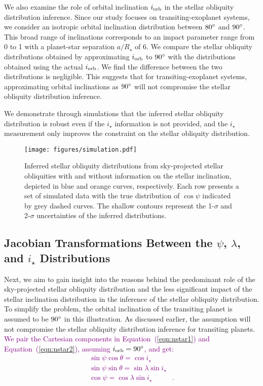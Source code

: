 \documentclass[twocolumn,times]{aastex631}
\newcommand{\edits}[1]{\textcolor{purple}{#1}}
\begin{document}
We also examine the role of orbital inclination $i_{\rm orb}$ in the stellar obliquity distribution inference. Since our study focuses on transiting-exoplanet systems, we consider an isotropic orbital inclination distribution between $80\mbox{$^\circ$}$ and $90\mbox{$^\circ$}$. This broad range of inclinations corresponds to an impact parameter range from 0 to 1 with a planet-star separation $a/R_\star$ of 6.
We compare the stellar obliquity distributions obtained by approximating $i_{\rm orb}$ to $90\mbox{$^\circ$}$ with the distributions obtained using the actual $i_{\rm orb}$. We find the difference between the two distributions is negligible. This suggests that for transiting-exoplanet systems, approximating orbital inclinations as $90\mbox{$^\circ$}$ will not compromise the stellar obliquity distribution inference.

We demonstrate through simulations that the inferred stellar obliquity distribution is robust even if the $i_\star$ information is not provided, and the $i_\star$ measurement only improves the constraint on the stellar obliquity distribution.

\begin{figure}[ht!]
    \centering
    \texttt{[image: figures/simulation.pdf]}
    \caption{Inferred stellar obliquity distributions from sky-projected stellar obliquities with and without information on the stellar inclination, depicted in blue and orange curves, respectively. Each row presents a set of simulated data with the true distribution of $\cos{\psi}$ indicated by grey dashed curves. The shallow contours represent the 1-$\sigma$ and 2-$\sigma$ uncertainties of the inferred distributions.}
    \label{fig:simulation}
\end{figure}

\subsection{Jacobian Transformations Between the $\psi$, $\lambda$, and \lowercase{$i_\star$} Distributions}\label{subsec:jacobian}

Next, we aim to gain insight into the reasons behind the predominant role of the sky-projected stellar obliquity distribution and the less significant impact of the stellar inclination distribution in the inference of the stellar obliquity distribution. To simplify the problem, the orbital inclination of the transiting planet is assumed to be $90\mbox{$^\circ$}$ in this illustration. As discussed earlier, the assumption will not compromise the stellar obliquity distribution inference for transiting planets.
\edits{We pair the Cartesian components in Equation~(\ref{eqn:nstar1}) and Equation~(\ref{eqn:nstar2}), assuming $i_{\rm orb} = 90\mbox{$^\circ$}$, and get:
\begin{align}
    \sin{\psi}\cos{\theta} = \cos{i_\star}& \label{eq:coord1}\\
    \sin{\psi}\sin{\theta} = \sin{\lambda}\sin{i_\star}& \label{eq:coord2}\\
    \cos{\psi} = \cos{\lambda}\sin{i_\star} \label{eq:coord3}&.
\end{align}
}
\end{document}

